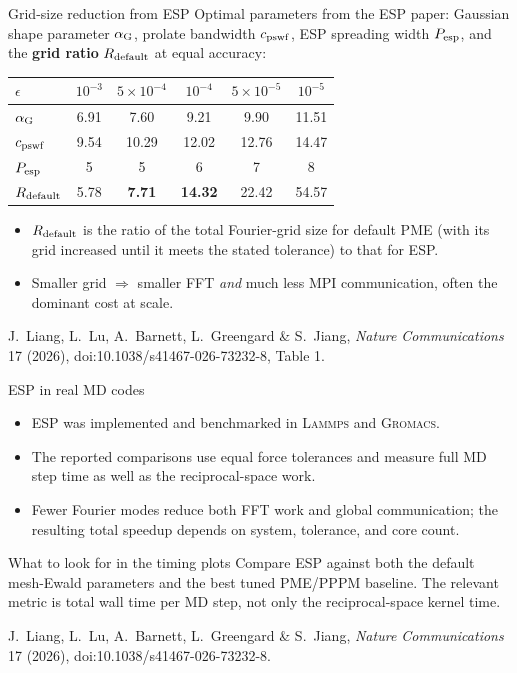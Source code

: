 \documentclass[aspectratio=169,11pt]{beamer}
\newcommand{\hl}[1]{{\color{CCMorange}\textbf{#1}}}
\newcommand{\gray}[1]{{\color{mygray}#1}}
\begin{document}
\begin{frame}{Grid-size reduction from ESP}
\small
Optimal parameters from the ESP paper: Gaussian shape parameter \(\alpha_{\rm G}\), prolate bandwidth \(c_{\rm pswf}\), ESP spreading width \(P_{\rm esp}\), and the \hl{grid ratio} \(R_{\rm default}\) at equal accuracy:
\begin{center}
\scriptsize
\begin{tabular}{lccccc}
\toprule
\(\epsilon\) & \(10^{-3}\) & \(5\times10^{-4}\) & \(10^{-4}\) & \(5\times10^{-5}\) & \(10^{-5}\)\\
\midrule
\(\alpha_{\rm G}\) & 6.91 & 7.60 & 9.21 & 9.90 & 11.51\\
\(c_{\rm pswf}\) & 9.54 & 10.29 & 12.02 & 12.76 & 14.47\\
\(P_{\rm esp}\) & 5 & 5 & 6 & 7 & 8\\
\midrule
\(R_{\rm default}\) & 5.78 & \textbf{7.71} & \textbf{14.32} & 22.42 & 54.57\\
\bottomrule
\end{tabular}
\end{center}
\begin{itemize}
  \item \(R_{\rm default}\) is the ratio of the total Fourier-grid size for default PME (with its grid increased until it meets the stated tolerance) to that for ESP.
  \item Smaller grid \(\Rightarrow\) smaller FFT \emph{and} much less MPI communication, often the dominant cost at scale.
\end{itemize}
{\scriptsize\gray{J.\ Liang, L.\ Lu, A.\ Barnett, L.\ Greengard \& S.\ Jiang, \emph{Nature Communications} 17 (2026), doi:10.1038/s41467-026-73232-8, Table 1.}}
\end{frame}

\begin{frame}{ESP in real MD codes}
\small
\begin{itemize}
  \item ESP was implemented and benchmarked in \textsc{Lammps} and \textsc{Gromacs}.
  \item The reported comparisons use equal force tolerances and measure full MD step time as well as the reciprocal-space work.
  \item Fewer Fourier modes reduce both FFT work and global communication; the resulting total speedup depends on system, tolerance, and core count.
\end{itemize}
\vspace{2mm}
\begin{block}{What to look for in the timing plots}
Compare ESP against both the default mesh-Ewald parameters and the best tuned
PME/PPPM baseline.  The relevant metric is total wall time per MD step, not only
the reciprocal-space kernel time.
\end{block}
{\scriptsize\gray{J.\ Liang, L.\ Lu, A.\ Barnett, L.\ Greengard \& S.\ Jiang, \emph{Nature Communications} 17 (2026), doi:10.1038/s41467-026-73232-8.}}
\end{frame}
\end{document}
